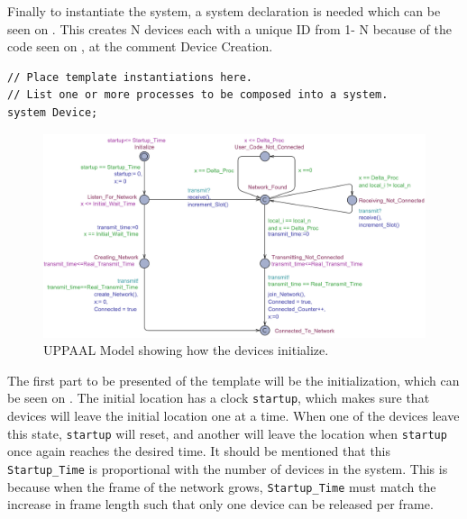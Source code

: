 Finally to instantiate the system, a system declaration is needed which can be seen on .
This creates N devices each with a unique ID from 1- N because of the code seen on , at the comment Device Creation.

\begin{lstlisting}[language={[GUI]Uppaal}, % use GUI flavor
columns={[l]flexible},
frameround=fftt, frame=shadowbox, rulesepcolor=\color{gray},
caption={Code for system declarations.}, label={UPPAAL_System_Dcl}]
// Place template instantiations here.
// List one or more processes to be composed into a system.
system Device;
\end{lstlisting}

\begin{figure}
  \includegraphics[width=1\textwidth]{Figures/Model/Device_Connecting.pdf} 
\caption{UPPAAL Model showing how the devices initialize.}
\label{fig:UPPAAL_Intitialization}
\end{figure}

\bigskip \noindent
The first part to be presented of the template will be the initialization, which can be seen on .
The initial location has a clock \texttt{startup}, which makes sure that devices will leave the initial location one at a time.
When one of the devices leave this state, \texttt{startup} will reset, and another will leave the location when \texttt{startup} once again reaches the desired time.
It should be mentioned that this \texttt{Startup\_Time} is proportional with the number of devices in the system.
This is because when the frame of the network grows, \texttt{Startup\_Time} must match the increase in frame length such that only one device can be released per frame.

